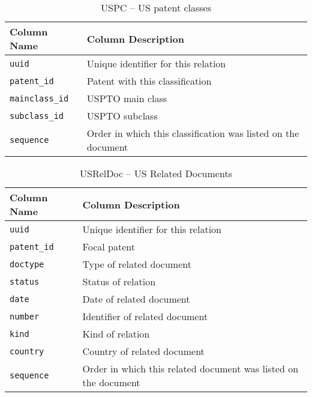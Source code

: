 \begin{table}[ht]
\center
\begin{tabular}{| l | l |}
\hline
Column Name & Column Description \\
\hline
\verb`uuid` & Unique identifier for this relation \\
\verb`patent_id` & Patent with this classification \\
\verb`mainclass_id` & USPTO main class \\
\verb`subclass_id` & USPTO subclass \\
\verb`sequence` & Order in which this classification was listed on the document \\
\hline
\end{tabular}
\caption{USPC -- US patent classes}
\end{table}

\begin{table}[ht]
\center
\begin{tabular}{| l | l |}
\hline
Column Name & Column Description \\
\hline
\verb`uuid` & Unique identifier for this relation \\
\verb`patent_id` & Focal patent \\
\verb`doctype` & Type of related document \\
\verb`status` & Status of relation \\
\verb`date` & Date of related document \\
\verb`number` & Identifier of related document \\
\verb`kind` & Kind of relation \\
\verb`country` & Country of related document \\
\verb`sequence` & Order in which this related document was listed on the document \\
\hline
\end{tabular}
\caption{USRelDoc -- US Related Documents}
\end{table}
